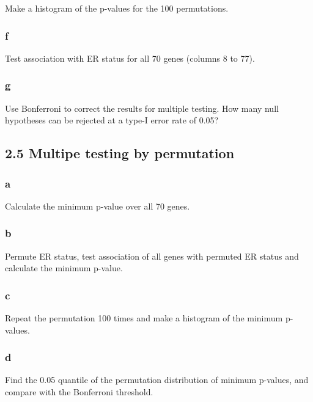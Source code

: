 \documentclass[]{article}
\begin{document}
Make a histogram of the p-values for the 100 permutations.

\hypertarget{f}{%
\subsubsection{f}\label{f}}

Test association with ER status for all 70 genes (columns 8 to 77).

\hypertarget{g}{%
\subsubsection{g}\label{g}}

Use Bonferroni to correct the results for multiple testing. How many
null hypotheses can be rejected at a type-I error rate of 0.05?

\hypertarget{multipe-testing-by-permutation}{%
\subsection{2.5 Multipe testing by
permutation}\label{multipe-testing-by-permutation}}

\hypertarget{a-3}{%
\subsubsection{a}\label{a-3}}

Calculate the minimum p-value over all 70 genes.

\hypertarget{b-3}{%
\subsubsection{b}\label{b-3}}

Permute ER status, test association of all genes with permuted ER status
and calculate the minimum p-value.

\hypertarget{c-3}{%
\subsubsection{c}\label{c-3}}

Repeat the permutation 100 times and make a histogram of the minimum
p-values.

\hypertarget{d-3}{%
\subsubsection{d}\label{d-3}}

Find the 0.05 quantile of the permutation distribution of minimum
p-values, and compare with the Bonferroni threshold.
\end{document}
